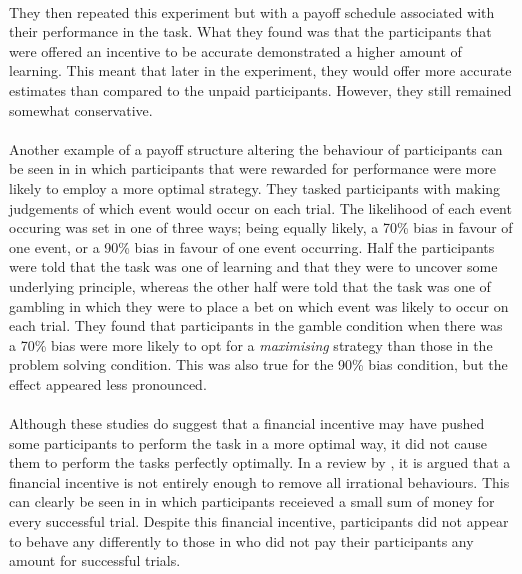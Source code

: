\documentclass[12pt]{article}
\begin{document}
\paragraph{} They then repeated this experiment but with a payoff schedule associated with their performance in the task. What they found was that the participants that were offered an incentive to be accurate demonstrated a higher amount of learning. This meant that later in the experiment, they would offer more accurate estimates than compared to the unpaid participants. However, they still remained somewhat conservative. 

\paragraph{} Another example of a payoff structure altering the behaviour of participants can be seen in \cite{Goodnow1955} in which participants that were rewarded for performance were more likely to employ a more optimal strategy. They tasked participants with making judgements of which event would occur on each trial. The likelihood of each event occuring was set in one of three ways; being equally likely, a 70\% bias in favour of one event, or a 90\% bias in favour of one event occurring. Half the participants were told that the task was one of learning and that they were to uncover some underlying principle, whereas the other half were told that the task was one of gambling in which they were to place a bet on which event was likely to occur on each trial. They found that participants in the gamble condition when there was a 70\% bias were more likely to opt for a \textit{maximising} strategy than those in the problem solving condition. This was also true for the 90\% bias condition, but the effect appeared less pronounced. 

\paragraph{} Although these studies do suggest that a financial incentive may have pushed some participants to perform the task in a more optimal way, it did not cause them to perform the tasks perfectly optimally. In a review by \cite{Camerer1999}, it is argued that a financial incentive is not entirely enough to remove all irrational behaviours. This can clearly be seen in \cite{morvan2012human} in which participants receieved a small sum of money for every successful trial. Despite this financial incentive, participants did not appear to behave any differently to those in \cite{clarke2015failure} who did not pay their participants any amount for successful trials. 
\end{document}
